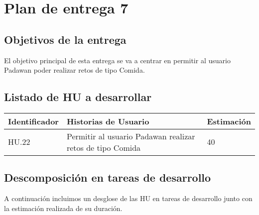 \section{Plan de entrega 7}

\subsection{Objetivos de la entrega}

El objetivo principal de esta entrega se va a centrar en permitir al usuario Padawan poder realizar retos de tipo Comida.

\subsection{Listado de HU a desarrollar}

\begin{table}[h]
	\centering
	\begin{tabular}{| p{2.3cm} | p{6.7cm} | p{2cm} |}
		\rowcolor[HTML]{329A9D} 
		{\color[HTML]{FFFFFF} \textbf{Identificador}} & {\color[HTML]{FFFFFF} \textbf{Historias de Usuario}} & {\color[HTML]{FFFFFF} \textbf{Estimación}}  \\ \hline
		HU.22 & Permitir al usuario Padawan realizar retos de tipo Comida & 40 \\ \hline
	\end{tabular}
\end{table}

\newpage

\subsection{Descomposición en tareas de desarrollo}

A continuación incluimos un desglose de las HU en tareas de desarrollo junto con la estimación realizada de su duración.\\

